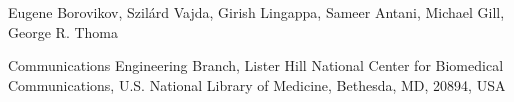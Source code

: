 \documentclass[landscape,a1]{a0poster}
\newcommand{\Heading}{\fontsize{60}{75}\selectfont}
\newcommand{\Authors}{\LARGE}
\newcommand{\Institutes}{\Large}
\begin{document}
\begin{header}
\vspace*{-2cm}
\begin{center}
	\begin{minipage}[t]{0.95\textwidth}
		\begin{center}
			\vspace{2cm}
			{\Authors Eugene Borovikov, Szil\'{a}rd Vajda, Girish Lingappa, Sameer Antani, Michael Gill, George R. Thoma}
			\vspace{1cm}
			{	\Institutes \centerline{ Communications Engineering Branch,  Lister Hill National Center for Biomedical Communications, U.S. National Library of Medicine, Bethesda, MD, 20894, USA}}
		\end{center}
	\end{minipage}
\end{center}

\end{header}

\vspace*{0.5cm}

\begin{poster}

\begin{multicols}{3}
















\end{multicols}
\end{poster}
\end{document}
